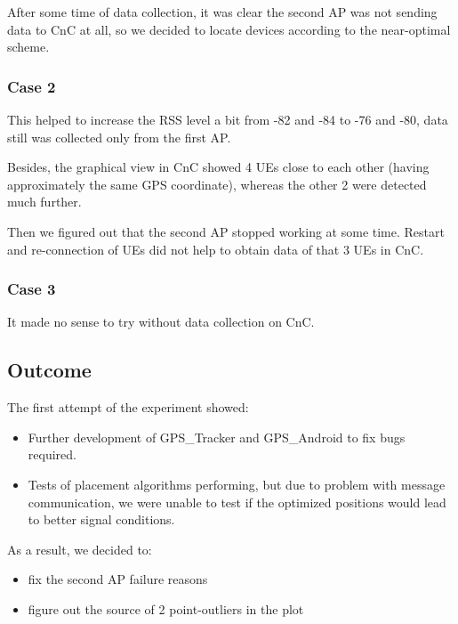 After some time of data collection, it was clear the second AP was not sending data to CnC at all, so we decided to locate devices according to the near-optimal scheme.

\subsubsection{Case 2}\label{case-2}

This helped to increase the RSS level a bit from -82 and -84 to -76 and
-80, data still was collected only from the first AP.

Besides, the graphical view in CnC showed 4 UEs close to each other (having approximately the same GPS coordinate), whereas the other 2 were detected much further.

Then we figured out that the second AP stopped working at some time. Restart and re-connection of UEs did not help to obtain data of that 3 UEs in CnC.

\subsubsection{Case 3}\label{case-3}

It made no sense to try without data collection on CnC.

\subsection{Outcome}\label{outcome}

The first attempt of the experiment showed:

\begin{itemize}
\tightlist
\item
  Further development of GPS\_Tracker and GPS\_Android to fix bugs required.
\item
  Tests of placement algorithms performing, but due to problem with message communication, we were unable to test if the optimized positions would lead to better signal conditions.
\end{itemize}

As a result, we decided to:

\begin{itemize}
\tightlist
\item
  fix the second AP failure reasons
\item
  figure out the source of 2 point-outliers in the plot
\end{itemize}
